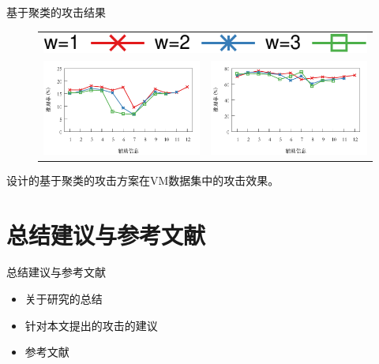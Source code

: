 \documentclass[aspectratio=43]{beamer}
\begin{document}
\begin{frame}{基于聚类的攻击结果}
\begin{figure}[!htbp]
    \centering
    \begin{tabular}{p{.48\linewidth}p{.48\linewidth}}
        \multicolumn{2}{c}{\includegraphics[width=.35\textwidth]{img/clu-effect-bar.pdf}}  \\
        \includegraphics[width=\linewidth]{img/clu-effect-rate.pdf} &
        \includegraphics[width=\linewidth]{img/clu-effect-pre.pdf}\\
    \end{tabular}
\end{figure}
\begin{card}
设计的基于聚类的攻击方案在VM数据集中的攻击效果。
\end{card}  
\end{frame}

\section{总结建议与参考文献}
\begin{frame}{总结建议与参考文献}
\begin{card}
\begin{itemize}
    \item 关于研究的总结
    \item 针对本文提出的攻击的建议
    \item 参考文献
\end{itemize}
\end{card}
\end{frame}
\end{document}
